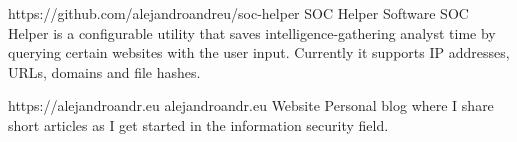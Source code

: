 

\begin{cventries}

  \cventry
    {https://github.com/alejandroandreu/soc-helper} %
    {SOC Helper} %
    {Software} %
    {} %
    {SOC Helper is a configurable utility that saves intelligence-gathering analyst time by querying certain websites with the user input. Currently it supports IP addresses, URLs, domains and file hashes.}

  \cventry
    {https://alejandroandr.eu} %
    {alejandroandr.eu} %
    {Website} %
    {} %
    {Personal blog where I share short articles as I get started in the information security field.}

\end{cventries}
